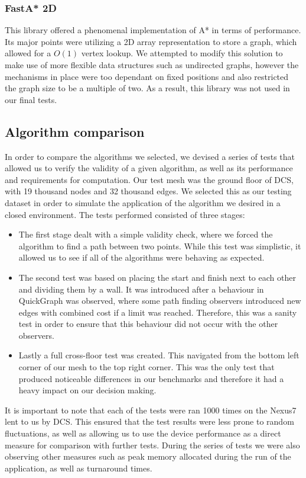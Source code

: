 \documentclass[main.tex]{subfiles}
\begin{document}
\subsubsection{FastA* 2D}
This library\cite{libFastA} offered a phenomenal implementation of A* in terms of performance. Its major points were utilizing a 2D array representation to store a graph, which allowed for a $O(1)$ vertex lookup. We attempted to modify this solution to make use of more flexible data structures such as undirected graphs, however the mechanisms in place were too dependant on fixed positions and also restricted the graph size to be a multiple of two. As a result, this library was not used in our final tests.

\subsection{Algorithm comparison}
In order to compare the algorithms we selected, we devised a series of tests that allowed us to verify the validity of a given algorithm, as well as its performance and requirements for computation. Our test mesh was the ground floor of DCS, with 19 thousand nodes and 32 thousand edges. We selected this as our testing dataset in order to simulate the application of the algorithm we desired in a closed environment. The tests performed consisted of three stages: 

\begin{itemize}
	\item The first stage dealt with a simple validity check, where we forced the algorithm to find a path between two points. While this test was simplistic, it allowed us to see if all of the algorithms were behaving as expected. 
	\item The second test was based on placing the start and finish next to each other and dividing them by a wall. It was introduced after a behaviour in QuickGraph was observed, where some path finding observers introduced new edges with combined cost if a limit was reached. Therefore, this was a sanity test in order to ensure that this behaviour did not occur with the other observers.
	\item Lastly a full cross-floor test was created. This navigated from the bottom left corner of our mesh to the top right corner. This was the only test that produced noticeable differences in our benchmarks and therefore it had a heavy impact on our decision making.
\end{itemize}

It is important to note that each of the tests were ran 1000 times on the Nexus7 lent to us by DCS. This ensured that the test results were less prone to random fluctuations, as well as allowing us to use the device performance as a direct measure for comparison with further tests. During the series of tests we were also observing other measures such as peak memory allocated during the run of the application, as well as turnaround times.
\end{document}
